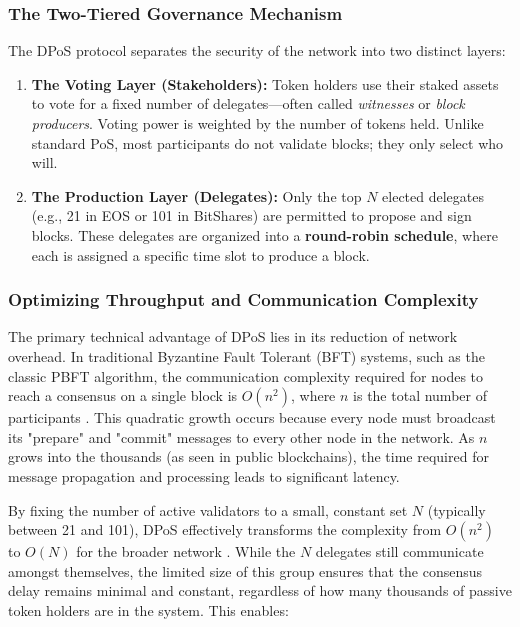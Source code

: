 \subsubsection{The Two-Tiered Governance Mechanism}
The DPoS protocol separates the security of the network into two distinct layers:
\begin{enumerate}
    \item \textbf{The Voting Layer (Stakeholders):} Token holders use their staked assets to vote for a fixed number of delegates—often called \textit{witnesses} or \textit{block producers}. Voting power is weighted by the number of tokens held. Unlike standard PoS, most participants do not validate blocks; they only select who will.
    \item \textbf{The Production Layer (Delegates):} Only the top $N$ elected delegates (e.g., 21 in EOS or 101 in BitShares) are permitted to propose and sign blocks. These delegates are organized into a \textbf{round-robin schedule}, where each is assigned a specific time slot to produce a block.
\end{enumerate}



\subsubsection{Optimizing Throughput and Communication Complexity}
The primary technical advantage of DPoS lies in its reduction of network overhead. In traditional Byzantine Fault Tolerant (BFT) systems, such as the classic PBFT algorithm, the communication complexity required for nodes to reach a consensus on a single block is $O(n^2)$, where $n$ is the total number of participants \cite{castro1999practical}. This quadratic growth occurs because every node must broadcast its "prepare" and "commit" messages to every other node in the network. As $n$ grows into the thousands (as seen in public blockchains), the time required for message propagation and processing leads to significant latency.


By fixing the number of active validators to a small, constant set $N$ (typically between 21 and 101), DPoS effectively transforms the complexity from $O(n^2)$ to $O(N)$ for the broader network \cite{larimer2014dpos, xu2018ecosystems}. While the $N$ delegates still communicate amongst themselves, the limited size of this group ensures that the consensus delay remains minimal and constant, regardless of how many thousands of passive token holders are in the system. This enables:

